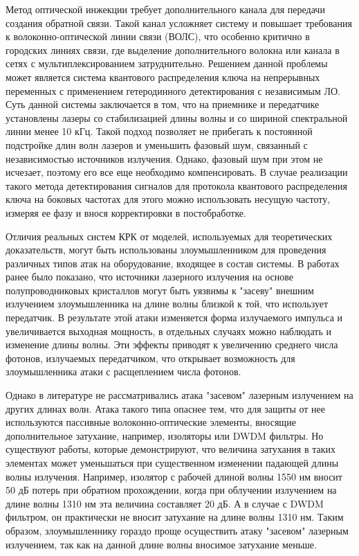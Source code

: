 Метод оптической инжекции требует дополнительного канала для передачи создания обратной связи. Такой канал усложняет систему и повышает требования к волоконно-оптической линии связи (ВОЛС), что особенно критично в городских линиях связи, где выделение дополнительного волокна или канала в сетях с мультиплексированием затруднительно. Решением данной проблемы может является система квантового распределения ключа на непрерывных переменных с применением гетеродинного детектирования с независимым ЛО. Суть данной системы заключается в том, что на приемнике и передатчике установлены лазеры со стабилизацией длины волны и со шириной спектральной линии менее 10 кГц. Такой подход позволяет не прибегать к постоянной подстройке длин волн лазеров и уменьшить фазовый шум, связанный с независимостью источников излучения.
Однако, фазовый шум при этом не исчезает, поэтому его все еще необходимо компенсировать. В случае реализации такого метода детектирования сигналов для протокола квантового распределения ключа на боковых частотах для этого можно использовать несущую частоту, измеряя ее фазу и внося корректировки в постобработке. 

Отличия реальных систем КРК от моделей, используемых для теоретических доказательств, могут быть использованы злоумышленником для проведения различных типов атак на оборудование, входящее в состав системы. В работах ранее было показано, что источники лазерного излучения на основе полупроводниковых кристаллов могут быть уязвимы к "засеву" внешним излучением злоумышленника на длине волны близкой к той, что использует передатчик. В результате этой атаки изменяется форма излучаемого импульса и увеличивается выходная мощность, в отдельных случаях можно наблюдать и изменение длины волны. Эти эффекты приводят к увеличению среднего числа фотонов, излучаемых передатчиком, что открывает возможность для злоумышленника атаки с расщеплением числа фотонов. 

Однако в литературе не рассматривались атака "засевом" лазерным излучением на других длинах волн. Атака такого типа опаснее тем, что для защиты от нее используются пассивные волоконно-оптические элементы, вносящие дополнительное затухание, например, изоляторы или DWDM фильтры. Но существуют работы, которые демонстрируют, что величина затухания в таких элементах может уменьшаться при существенном изменении падающей длины волны излучения. Например, изолятор с рабочей длиной волны 1550 нм вносит 50 дБ потерь при обратном прохождении, когда при облучении излучением на длине волны 1310 нм эта величина составляет 20 дБ. А в случае с DWDM фильтром, он практически не вносит затухание на длине волны 1310 нм. Таким образом, злоумышленнику гораздо проще осуществить атаку "засевом" лазерным излучением, так как на данной длине волны вносимое затухание меньше. 

